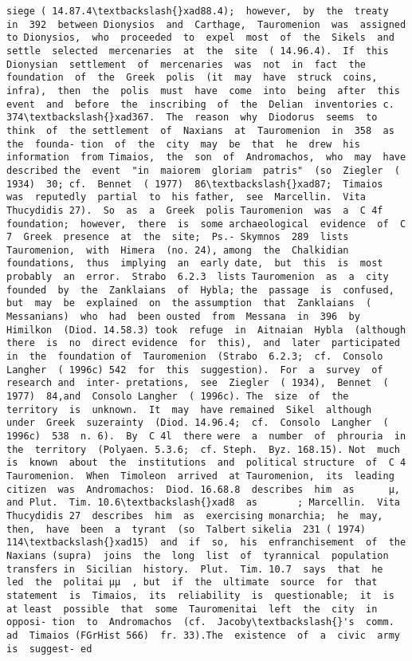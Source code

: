\documentclass[11pt]{article}
\begin{document}
\begin{Verbatim}[commandchars=\\\{\}]
siege ( 14.87.4\textbackslash{}xad88.4);  however,  by  the  treaty  in  392  between Dionysios  and  Carthage,  Tauromenion  was  assigned  to Dionysios,  who  proceeded  to  expel  most  of  the  Sikels  and settle  selected  mercenaries  at  the  site  ( 14.96.4).  If  this Dionysian  settlement  of  mercenaries  was  not  in  fact  the foundation  of  the  Greek  polis  (it  may  have  struck  coins, infra),  then  the  polis  must  have  come  into  being  after  this event  and  before  the  inscribing  of  the  Delian  inventories c. 374\textbackslash{}xad367.  The  reason  why  Diodorus  seems  to  think  of  the settlement  of  Naxians  at  Tauromenion  in  358  as  the  founda- tion  of  the  city  may  be  that  he  drew  his  information  from Timaios,  the  son  of  Andromachos,  who  may  have  described the  event  "in  maiorem  gloriam  patris"  (so  Ziegler  ( 1934)  30; cf.  Bennet  ( 1977)  86\textbackslash{}xad87;  Timaios  was  reputedly  partial  to  his father,  see  Marcellin.  Vita  Thucydidis 27).  So  as  a  Greek  polis Tauromenion  was  a  C 4f  foundation;  however,  there  is  some archaeological  evidence  of  C 7  Greek  presence  at  the  site;  Ps.- Skymnos  289  lists  Tauromenion,  with  Himera  (no. 24), among  the  Chalkidian  foundations,  thus  implying  an  early date,  but  this  is  most  probably  an  error.  Strabo  6.2.3  lists Tauromenion  as  a  city  founded  by  the  Zanklaians  of  Hybla; the  passage  is  confused,  but  may  be  explained  on  the assumption  that  Zanklaians  (  Messanians)  who  had  been ousted  from  Messana  in  396  by  Himilkon  (Diod. 14.58.3) took  refuge  in  Aitnaian  Hybla  (although  there  is  no  direct evidence  for  this),  and  later  participated  in  the  foundation of  Tauromenion  (Strabo  6.2.3;  cf.  Consolo  Langher  ( 1996c) 542  for  this  suggestion).  For  a  survey  of  research and  inter- pretations,  see  Ziegler  ( 1934),  Bennet  ( 1977)  84,and  Consolo Langher  ( 1996c). The  size  of  the  territory  is  unknown.  It  may  have remained  Sikel  although  under  Greek  suzerainty  (Diod. 14.96.4;  cf.  Consolo  Langher  ( 1996c)  538  n. 6).  By  C 4l  there were  a  number  of  phrouria  in  the  territory  (Polyaen. 5.3.6;  cf. Steph.  Byz. 168.15). Not  much  is  known  about  the  institutions  and  political structure  of  C 4  Tauromenion.  When  Timoleon  arrived  at Tauromenion,  its  leading  citizen  was  Andromachos:  Diod. 16.68.8  describes  him  as      µ,  and Plut.  Tim. 10.6\textbackslash{}xad8  as       ; Marcellin.  Vita  Thucydidis 27  describes  him  as  exercising monarchia;  he  may,  then,  have  been  a  tyrant  (so  Talbert sikelia  231 ( 1974)  114\textbackslash{}xad15)  and  if  so,  his  enfranchisement  of  the  Naxians (supra)  joins  the  long  list  of  tyrannical  population  transfers in  Sicilian  history.  Plut.  Tim. 10.7  says  that  he  led  the  politai µµ  , but  if  the  ultimate  source  for  that statement  is  Timaios,  its  reliability  is  questionable;  it  is  at least  possible  that  some  Tauromenitai  left  the  city  in  opposi- tion  to  Andromachos  (cf.  Jacoby\textbackslash{}'s  comm.  ad  Timaios (FGrHist 566)  fr. 33).The  existence  of  a  civic  army  is  suggest- ed  
\end{Verbatim}
\end{document}
